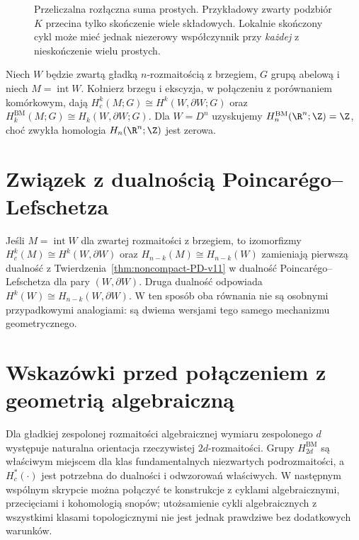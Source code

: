 \begin{figure}[!htbp]
\centering
{}
\caption{Przeliczalna rozłączna suma prostych.
Przykładowy zwarty podzbiór $K$ przecina tylko
skończenie wiele składowych. Lokalnie skończony
cykl może mieć jednak niezerowy współczynnik
przy \emph{każdej} z nieskończenie wielu prostych.}
\label{fig:BM-countable-lines}
\end{figure}

\begin{przyklad}
Niech $W$ będzie zwartą gładką $n$-rozmaitością
z brzegiem, $G$ grupą abelową i niech
$M=\operatorname{int}W$.
Kołnierz brzegu i ekscyzja, w połączeniu z
porównaniem komórkowym, dają
$H_c^k(M;G)\cong H^k(W,\partial W;G)$ oraz
$H_k^{\mathrm{BM}}(M;G)\cong H_k(W,\partial W;G)$.
Dla $W=D^n$ uzyskujemy
$H_n^{\mathrm{BM}}(\R^n;\Z)=\Z$,
choć zwykła homologia $H_n(\R^n;\Z)$ jest zerowa.
\end{przyklad}

\section{Związek z dualnością Poincarégo--Lefschetza}
Jeśli $M=\operatorname{int}W$ dla zwartej rozmaitości
z brzegiem, to izomorfizmy
$H_c^k(M)\cong H^k(W,\partial W)$ oraz
$H_{n-k}(M)\cong H_{n-k}(W)$
zamieniają pierwszą dualność z
Twierdzenia~\ref{thm:noncompact-PD-v11}
w dualność Poincarégo--Lefschetza dla pary
$(W,\partial W)$. Druga dualność odpowiada
$H^k(W)\cong H_{n-k}(W,\partial W)$.
W ten sposób oba równania nie są osobnymi
przypadkowymi analogiami: są dwiema wersjami
tego samego mechanizmu geometrycznego.

\section{Wskazówki przed połączeniem z geometrią algebraiczną}
Dla gładkiej zespolonej rozmaitości algebraicznej
wymiaru zespolonego $d$ występuje naturalna orientacja
rzeczywistej $2d$-rozmaitości. Grupy
$H_{2d}^{\mathrm{BM}}$ są właściwym miejscem dla klas
fundamentalnych niezwartych podrozmaitości, a
$H_c^*(\cdot)$ jest potrzebna do dualności i odwzorowań
właściwych. W następnym wspólnym skrypcie można
połączyć te konstrukcje z cyklami algebraicznymi,
przecięciami i kohomologią snopów; utożsamienie
cykli algebraicznych z wszystkimi klasami topologicznymi
nie jest jednak prawdziwe bez dodatkowych warunków.



